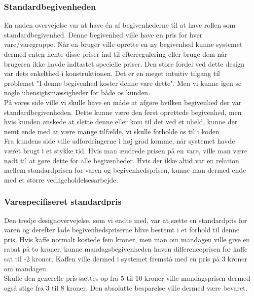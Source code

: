 \documentclass[]{article}
\begin{document}
\subsubsection{Standardbegivenheden}
En anden overvejelse var at have én af begivenhederne til at have rollen som standardbegivenhed. Denne begivenhed ville have en pris for hver vare/varegruppe. Når en bruger ville oprette en ny begivenhed kunne systemet dermed enten hente disse priser ind til efterregulering eller bruge dem når brugeren ikke havde indtastet specielle priser. %
Den store fordel ved dette design var dets enkelthed i konstruktionen. Det er en meget intuitiv tilgang til problemet "I denne begivenhed koster denne vare dette". Men vi kunne igen se nogle uhensigtsmæssigheder for både os kunden. \\
\indent På vores side ville vi skulle have en måde at afgøre hvilken begivenhed der var standardbegivenheden. Dette kunne være den først oprettede begivenhed, men hvis kunden ønskede at slette denne eller kom til det ved et uheld, kunne der nemt ende med at være mange tilfælde, vi skulle forholde os til i koden. \\
\indent Fra kundens side ville udfordringerne i høj grad komme, når systemet havde været brugt i et stykke tid. Hvis man ændrede prisen på en vare, ville man være nødt til at gøre dette for alle begivenheder. Hvis der ikke altid var en relation mellem standardprisen for varen og begivenhedsprisen, kunne man dermed ende med et større vedligeholdelsesarbejde. 

\subsubsection{Varespecifiseret standardpris}
Den tredje designovervejelse, som vi endte med, var at sætte en standardpris for varen og derefter lade begivenhedspriserne blive bestemt i et forhold til denne pris. Hvis kaffe normalt kostede fem kroner, men man om mandagen ville give en rabat på to kroner, kunne mandagsbegivenheden haven differenceprisen for kaffe sat til -2 kroner. Kaffen ville dermed i systemet fremstå med en pris på 3 kroner om mandagen.\\
Skulle den generelle pris sættes op fra 5 til 10 kroner ville mandagsprisen dermed også stige fra 3 til 8 kroner. Den absolutte besparelse ville dermed være bevaret.
\end{document}
